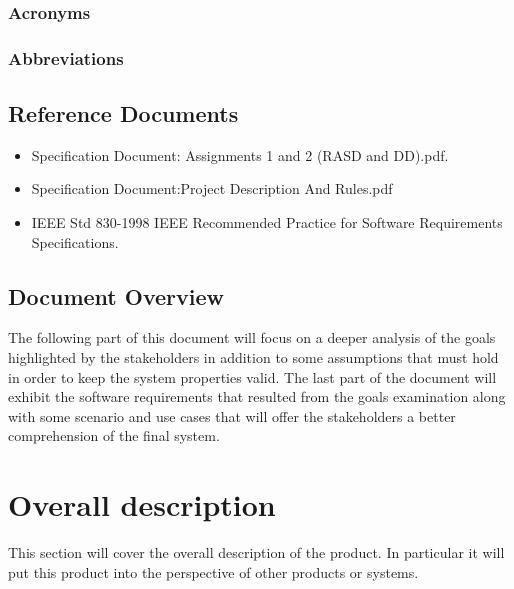 \documentclass[11pt, a4paper,titlepage]{article}
\begin{document}
\subsubsection{Acronyms}
\subsubsection{Abbreviations}
\subsection{Reference Documents}
	\begin{itemize}
		\item Specification Document: Assignments 1 and 2 (RASD and DD).pdf.
		\item Specification Document:Project Description And Rules.pdf
		\item IEEE Std 830-1998 IEEE Recommended Practice for Software Requirements Specifications.
		
	\end{itemize}
\subsection{Document Overview}
The following part of this document will focus on a deeper analysis of the goals highlighted by the stakeholders in addition to some assumptions that must hold in order to keep the system properties valid. The last part of the document will exhibit the software requirements that resulted from the goals examination along with some scenario and use cases that will offer the stakeholders a better comprehension of the final system.   
\section{Overall description}
This section will cover the overall description of the product. In particular it will put this product into the perspective of other products or systems. 
\end{document}
